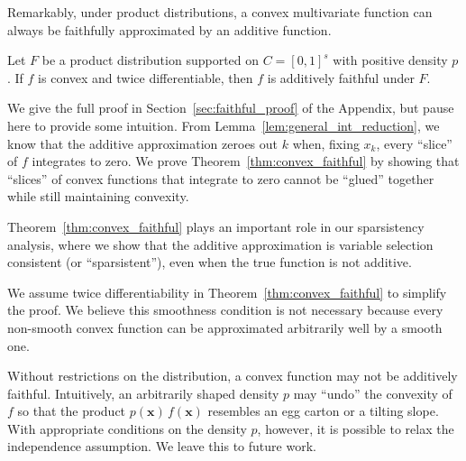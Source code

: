 Remarkably, under product distributions, a convex multivariate function can always be faithfully approximated by an additive function. 

\begin{theorem}
\label{thm:convex_faithful}
Let $F$ be a product distribution supported on $C=[0,1]^s$ with positive density $p$. If $f$ is convex and twice differentiable, then $f$ is additively faithful under $F$.
\end{theorem}

We give the full proof in Section~\ref{sec:faithful_proof} of the
Appendix, but pause here to provide some intuition. From
Lemma~\ref{lem:general_int_reduction}, we know that the
additive approximation zeroes out $k$ when, fixing $x_k$, every
``slice'' of $f$ integrates to zero. We prove
Theorem~\ref{thm:convex_faithful} by showing that ``slices'' of convex
functions that integrate to zero cannot be ``glued'' together while
still maintaining convexity.

Theorem~\ref{thm:convex_faithful} plays an important role in our
sparsistency analysis, where we show that the additive
approximation is variable selection consistent (or ``sparsistent''), even when the true function is not
additive.

\begin{remark}
  We assume twice differentiability in
  Theorem~\ref{thm:convex_faithful} to simplify the proof. We believe
  this smoothness condition is not necessary because every non-smooth
  convex function can be approximated arbitrarily well by a smooth
  one.  
\end{remark}
\begin{remark}
Without restrictions on the distribution, a convex
  function may not be additively faithful. Intuitively, an arbitrarily shaped
  density $p$
  may ``undo'' the convexity of $f$ so that the product
  $p(\mathbf{x}) \, f(\mathbf{x})$ resembles an egg carton or a
  tilting slope.  With appropriate conditions on the density $p$,
  however, it is possible to relax the independence assumption.  We leave this to
  future work.
\end{remark}


 

